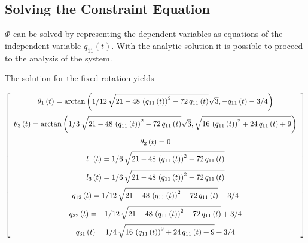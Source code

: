 \subsection{Solving the Constraint Equation}

$\Phi$ can be solved by representing the dependent variables as equations of the independent variable $q_{11}(t)$.
With the analytic solution it is possible to proceed to the analysis of the system.

The solution for the fixed rotation yields 

\begin{equation*}
    \left[ \begin {array}{c} \theta_{1} \left( t \right) =\arctan \left( 
1/12\,\sqrt {21-48\, \left( q_{11} \left( t \right)  \right) ^{2}-72\,
q_{11} \left( t \right) }\sqrt {3},-q_{11} \left( t \right) -3/4
 \right) \\ \noalign{\medskip}\theta_{3} \left( t \right) =\arctan
 \left( 1/3\,\sqrt {21-48\, \left( q_{11} \left( t \right)  \right) ^{
2}-72\,q_{11} \left( t \right) }\sqrt {3},\sqrt {16\, \left( q_{11}
 \left( t \right)  \right) ^{2}+24\,q_{11} \left( t \right) +9}
 \right) \\ \noalign{\medskip}\theta_{2} \left( t \right) =0
\\ \noalign{\medskip}l_{1} \left( t \right) =1/6\,\sqrt {21-48\,
 \left( q_{11} \left( t \right)  \right) ^{2}-72\,q_{11} \left( t
 \right) }\\ \noalign{\medskip}l_{3} \left( t \right) =1/6\,\sqrt {21-
48\, \left( q_{11} \left( t \right)  \right) ^{2}-72\,q_{11} \left( t
 \right) }\\ \noalign{\medskip}q_{12} \left( t \right) =1/12\,\sqrt {
21-48\, \left( q_{11} \left( t \right)  \right) ^{2}-72\,q_{11}
 \left( t \right) }-3/4\\ \noalign{\medskip}q_{32} \left( t \right) =-
1/12\,\sqrt {21-48\, \left( q_{11} \left( t \right)  \right) ^{2}-72\,
q_{11} \left( t \right) }+3/4\\ \noalign{\medskip}q_{31} \left( t
 \right) =1/4\,\sqrt {16\, \left( q_{11} \left( t \right)  \right) ^{2
}+24\,q_{11} \left( t \right) +9}+3/4\end {array} \right] 
\end{equation*}
